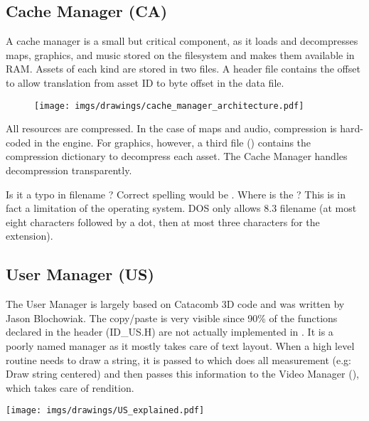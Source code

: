 \documentclass[book.tex]{subfiles}
\begin{document}
\subsection{Cache Manager (CA)}
A cache manager is a small but critical component, as it loads and decompresses maps, graphics, and music stored on the filesystem and makes them available in RAM. Assets of each kind are stored in two files. A header file contains the offset to allow translation from asset ID to byte offset in the data file.\\
 \par
\begin{figure}[H]
\centering
 \texttt{[image: imgs/drawings/cache\_manager\_architecture.pdf]}
 \end{figure}
 \par
{} All resources are compressed. In the case of maps and audio, compression is hard-coded in the engine. For graphics, however, a third file () contains the compression dictionary to decompress each asset. The Cache Manager handles decompression transparently.\\
\par
{} Is it a typo in filename  ? Correct spelling would be . Where is the ? This is in fact a limitation of the operating system. DOS only allows 8.3 filename (at most eight characters followed by a dot, then at most three characters for the extension).








\subsection{User Manager (US)}
\begin{minipage}{0.7\textwidth}
The User Manager is largely based on Catacomb 3D code and was written by Jason Blochowiak. The copy/paste is very visible since 90\% of the functions declared in the header (ID\_US.H) are not actually implemented in . 
It is a poorly named manager as it mostly takes care of text layout. When a  high level routine needs to draw a string, it is passed to  which does all measurement (e.g: Draw string centered)
and then passes this information to the Video Manager (), which takes care of rendition.
\end{minipage}
\begin{minipage}{0.3\textwidth}
\begin{flushright}
\texttt{[image: imgs/drawings/US\_explained.pdf]}
\end{flushright}
\end{minipage}
\noindent
\\
\end{document}
